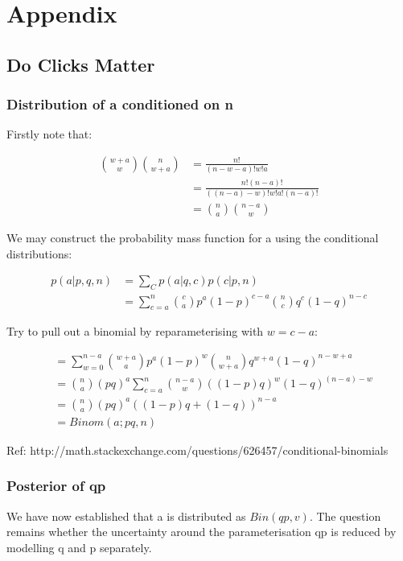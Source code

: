 \documentclass[11pt,a4,singlespacing,titlepagenumber=on]{scrreprt}
\numberwithin{equation}{chapter} %
\theoremstyle{remark}
\begin{document}
\chapter{Appendix}

\section{Do Clicks Matter}

\subsection{Distribution of a conditioned on n}

Firstly note that:

\begin{align}
{w+a \choose w}{n \choose w+a} &= \frac{n!}{(n-w-a)!w!a} \\
	&= \frac{n!(n-a)!}{((n-a)-w)!w!a!(n-a)!} \\
	&=  {n \choose a}{n-a \choose w}
\end{align}

We may construct the probability mass function for a using the conditional distributions:

\begin{align}
p(a|p,q,n) &= \sum_C p(a|q,c)p(c|p,n) \\
 &= \sum_{c=a}^n {c \choose a} p^a(1-p)^{c-a} {n \choose c} q^c (1-q)^{n-c}
\end{align}

Try to pull out a binomial by reparameterising with $ w = c-a$:

\begin{align}
&= \sum_{w=0}^{n-a} {w+a \choose a} p^a(1-p)^w {n \choose w+a} q^{w+a} (1-q)^{n-w+a} \\
&= {n \choose a} (pq)^a \sum_{c=a}^n {n-a \choose w} ((1-p)q)^w (1-q)^{(n-a)-w} \\
&= {n \choose a} (pq)^a ((1-p)q +  (1-q))^{n-a} \\
&= Binom(a;pq,n)
\end{align}

Ref: http://math.stackexchange.com/questions/626457/conditional-binomials

\subsection{Posterior of qp}

We have now established that a is distributed as $Bin(qp,v)$. The question remains whether the uncertainty around the parameterisation qp is reduced by modelling q and p separately.
\end{document}
